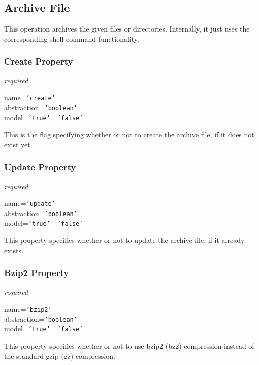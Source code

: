 %
%
%
%
%
%

\subsection{Archive File}
\label{archive_file_heading}

This operation archives the given files or directories. Internally, it just
uses the corresponding shell command functionality.

\subsubsection{Create Property}

\emph{required}

name=\texttt{'create'}\\
abstraction=\texttt{'boolean'}\\
model=\texttt{'true' \vline\ 'false'}

This is the flag specifying whether or not to create the archive file, if it
does not exist yet.

\subsubsection{Update Property}

\emph{required}

name=\texttt{'update'}\\
abstraction=\texttt{'boolean'}\\
model=\texttt{'true' \vline\ 'false'}

This property specifies whether or not to update the archive file, if it
already exists.

\subsubsection{Bzip2 Property}

\emph{required}

name=\texttt{'bzip2'}\\
abstraction=\texttt{'boolean'}\\
model=\texttt{'true' \vline\ 'false'}

This property specifies whether or not to use bzip2 (bz2) compression instead
of the standard gzip (gz) compression.
